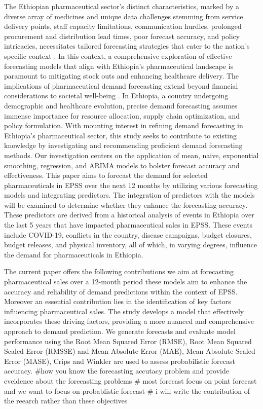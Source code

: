 \documentclass[
  authoryear,
  preprint,
  3p]{elsarticle}
\begin{document}
The Ethiopian pharmaceutical sector's distinct characteristics, marked
by a diverse array of medicines and unique data challenges stemming from
service delivery points, staff capacity limitations, communication
hurdles, prolonged procurement and distribution lead times, poor
forecast accuracy, and policy intricacies, necessitates tailored
forecasting strategies that cater to the nation's specific context
\citep{boche2022procurement}. In this context, a comprehensive
exploration of effective forecasting models that align with Ethiopia's
pharmaceutical landscape is paramount to mitigating stock outs and
enhancing healthcare delivery. The implications of pharmaceutical demand
forecasting extend beyond financial considerations to societal
well-being \citep{rostami2022forecasting}. In Ethiopia, a country
undergoing demographic and healthcare evolution, precise demand
forecasting assumes immense importance for resource allocation, supply
chain optimization, and policy formulation. With mounting interest in
refining demand forecasting in Ethiopia's pharmaceutical sector, this
study seeks to contribute to existing knowledge by investigating and
recommending proficient demand forecasting methods. Our investigation
centers on the application of mean, naive, exponential smoothing,
regression, and ARIMA models to bolster forecast accuracy and
effectiveness. This paper aims to forecast the demand for selected
pharmaceuticals in EPSS over the next 12 months by utilizing various
forecasting models and integrating predictors. The integration of
predictors with the models will be examined to determine whether they
enhance the forecasting accuracy. These predictors are derived from a
historical analysis of events in Ethiopia over the last 5 years that
have impacted pharmaceutical sales in EPSS. These events include
COVID-19, conflicts in the country, disease campaigns, budget closures,
budget releases, and physical inventory, all of which, in varying
degrees, influence the demand for pharmaceuticals in Ethiopia.

The current paper offers the following contributions we aim at
forecasting pharmaceutical sales over a 12-month period these models aim
to enhance the accuracy and reliability of demand predictions within the
context of EPSS. Moreover an essential contribution lies in the
identification of key factors influencing pharmaceutical sales. The
study develops a model that effectively incorporates these driving
factors, providing a more nuanced and comprehensive approach to demand
prediction. We generate forecasts and evaluate model performance using
the Root Mean Squared Error (RMSE), Root Mean Squared Scaled Error
(RMSSE) and Mean Absolute Error (MAE), Mean Absolute Scaled Error
(MASE), Crips and Winkler are used to assess probabilistic forecast
accuracy. \#how you know the forecasting accutacy problem and provide
eveidence about the forecasting problems \# most forecast focus on point
forecast and we want to focus on probablistic forecast \# i will write
the contribution of the reearch rather than these objectives
\end{document}
